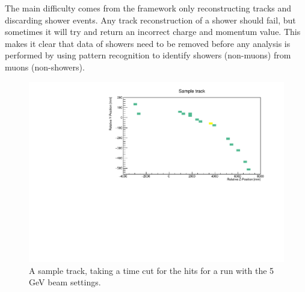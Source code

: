 The main difficulty comes from the framework only reconstructing tracks and discarding shower events. Any track reconstruction of a shower should fail, but sometimes it will try and return an incorrect charge and momentum value. This makes it clear that data of showers need to be removed before any analysis is performed by using pattern recognition to identify showers (non-muons) from muons (non-showers).

\begin{figure}[h!]
\centering
\includegraphics[width=\textwidth]{figures/SampleTrack5GeVYZ.pdf}
\caption{A sample track, taking a time cut for the hits for a run with the 5 GeV beam settings.}
\label{fig:event}
\end{figure}

